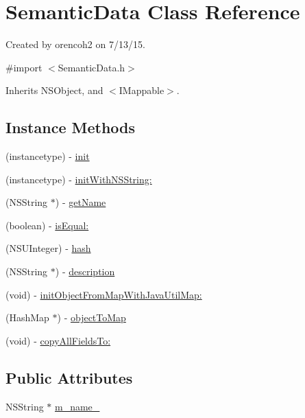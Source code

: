 \hypertarget{interface_semantic_data}{}\section{Semantic\+Data Class Reference}
\label{interface_semantic_data}


Created by orencoh2 on 7/13/15.  




{\ttfamily \#import $<$Semantic\+Data.\+h$>$}



Inherits N\+S\+Object, and $<$\+I\+Mappable$>$.

\subsection*{Instance Methods}
\begin{DoxyCompactItemize}
\item 
(instancetype) -\/ \hyperlink{interface_semantic_data_abf7ba2bc9f79ac5ff45955b4bc5aba11}{init}
\item 
(instancetype) -\/ \hyperlink{interface_semantic_data_a9ba686920fad3de6b135fa3655c5f0f8}{init\+With\+N\+S\+String\+:}
\item 
(N\+S\+String $\ast$) -\/ \hyperlink{interface_semantic_data_a43bd6891d8ecf9835a0f70f2fba68af8}{get\+Name}
\item 
(boolean) -\/ \hyperlink{interface_semantic_data_a03c98f505b2702ae370e699d6914d679}{is\+Equal\+:}
\item 
(N\+S\+U\+Integer) -\/ \hyperlink{interface_semantic_data_aa819ef9e7648860635fb977acbf5876e}{hash}
\item 
(N\+S\+String $\ast$) -\/ \hyperlink{interface_semantic_data_a4268a49edf3f8393fb80b559821a33b7}{description}
\item 
(void) -\/ \hyperlink{interface_semantic_data_aa19969a44109ef6af83a05c3e0a31a7d}{init\+Object\+From\+Map\+With\+Java\+Util\+Map\+:}
\item 
(Hash\+Map $\ast$) -\/ \hyperlink{interface_semantic_data_a36c74956828668669c73f2785cd4f32b}{object\+To\+Map}
\item 
(void) -\/ \hyperlink{interface_semantic_data_a9649a7ebf6171d7698c8e0bb7b856dc7}{copy\+All\+Fields\+To\+:}
\end{DoxyCompactItemize}
\subsection*{Public Attributes}
\begin{DoxyCompactItemize}
\item 
N\+S\+String $\ast$ \hyperlink{interface_semantic_data_a779adb63635c1ddaa43a02740aecfbc2}{m\+\_\+name\+\_\+}
\end{DoxyCompactItemize}


